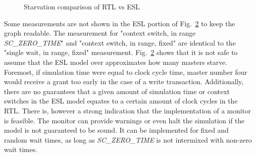 \begin{figure}[hbt]
\begin{subfigure}{.5\textwidth}
  \label{fig:sub2}
\end{subfigure}
\caption{Starvation comparison of RTL vs ESL}
\label{fig:starvation}
\end{figure}

Some measurements are not shown in the ESL portion of Fig.~\ref{fig:starvation} to keep the graph readable. The measurement for "context switch, in range  \textit{SC\_ZERO\_TIME}" and "context switch, in range, fixed"  are identical to the "single wait, in range, fixed" measurement. 
Fig.~\ref{fig:starvation} shows that it is not safe to assume that the ESL model over approximates how many masters starve. Foremost, if simulation time were equal to clock cycle time, master number four would receive a grant too early in the case of a write transaction. Additionally, there are no guarantees that a given amount of simulation time or context switches in the ESL model equates to a certain amount of clock cycles in the RTL. There is, however a strong indication that the implementation of a monitor is feasible. The monitor can provide warnings or even halt the simulation if the model is not guaranteed to be sound. It can be implemented for fixed and random wait times, as long as \textit{SC\_ZERO\_TIME} is not intermixed with non-zero wait times.     


